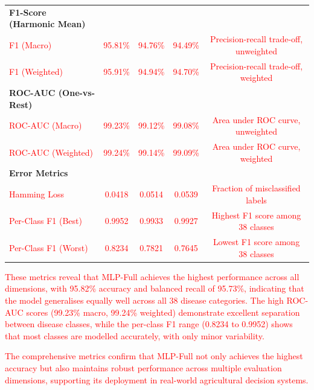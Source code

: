 {\begin{table}[htbp]
\begin{tabular*}{\textwidth}{@{\extracolsep\fill}lcccc@{}}
\midrule
\textbf{F1-Score (Harmonic Mean)} \\
\textcolor{red}{F1 (Macro)}                  & \textcolor{red}{95.81\%} & \textcolor{red}{94.76\%} & \textcolor{red}{94.49\%} & \textcolor{red}{Precision-recall trade-off, unweighted} \\
\textcolor{red}{F1 (Weighted)}               & \textcolor{red}{95.91\%} & \textcolor{red}{94.94\%} & \textcolor{red}{94.70\%} & \textcolor{red}{Precision-recall trade-off, weighted} \\
\midrule
\textbf{ROC-AUC (One-vs-Rest)} \\
\textcolor{red}{ROC-AUC (Macro)}             & \textcolor{red}{99.23\%} & \textcolor{red}{99.12\%} & \textcolor{red}{99.08\%} & \textcolor{red}{Area under ROC curve, unweighted} \\
\textcolor{red}{ROC-AUC (Weighted)}          & \textcolor{red}{99.24\%} & \textcolor{red}{99.14\%} & \textcolor{red}{99.09\%} & \textcolor{red}{Area under ROC curve, weighted} \\
\midrule
\textbf{Error Metrics} \\
\textcolor{red}{Hamming Loss}                & \textcolor{red}{0.0418} & \textcolor{red}{0.0514} & \textcolor{red}{0.0539} & \textcolor{red}{Fraction of misclassified labels} \\
\textcolor{red}{Per-Class F1 (Best)}         & \textcolor{red}{0.9952} & \textcolor{red}{0.9933} & \textcolor{red}{0.9927} & \textcolor{red}{Highest F1 score among 38 classes} \\
\textcolor{red}{Per-Class F1 (Worst)}        & \textcolor{red}{0.8234} & \textcolor{red}{0.7821} & \textcolor{red}{0.7645} & \textcolor{red}{Lowest F1 score among 38 classes} \\
\bottomrule
\end{tabular*}
\end{table}

\textcolor{red}{
These metrics reveal that MLP-Full achieves the highest performance across all dimensions, with 95.82\% accuracy and balanced recall of 95.73\%, indicating that the model generalises equally well across all 38 disease categories. The high ROC-AUC scores (99.23\% macro, 99.24\% weighted) demonstrate excellent separation between disease classes, while the per-class F1 range (0.8234 to 0.9952) shows that most classes are modelled accurately, with only minor variability.

The comprehensive metrics confirm that MLP-Full not only achieves the highest accuracy but also maintains robust performance across multiple evaluation dimensions, supporting its deployment in real-world agricultural decision systems.
}

}
